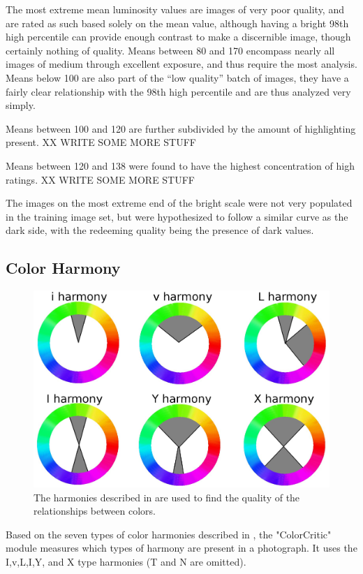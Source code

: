 \documentclass[twocolumn]{article}
\begin{document}
The most extreme mean luminosity values are images of very poor quality, and are rated as such based solely on the mean value, although having a bright 98th high percentile can provide enough contrast to make a discernible image, though certainly nothing of quality. Means between 80 and 170 encompass nearly all images of medium through excellent exposure, and thus require the most analysis. Means below 100 are also part of the “low quality” batch of images, they have a fairly clear relationship with the 98th high percentile and are thus analyzed very simply.

Means between 100 and 120 are further subdivided by the amount of highlighting present. XX WRITE SOME MORE STUFF

Means between 120 and 138 were found to have the highest concentration of high ratings. XX WRITE SOME MORE STUFF

The images on the most extreme end of the bright scale were not very populated in the training image set, but were hypothesized to follow a similar curve as the dark side, with the redeeming quality being the presence of dark values.

\subsection{Color Harmony}   
\begin{figure}[t]
  \centering
    \includegraphics[scale=0.38,clip]{colorharmony.eps}
  \caption{The harmonies described in \cite{COL:COL10004} are used to find the quality of the relationships between colors.}
\end{figure}

Based on the seven types of color harmonies described in \cite{Cohen-Or:2006:CH:1179352.1141933}, the "ColorCritic" module measures which types of harmony are present in a photograph. It uses the I,v,L,I,Y, and X type harmonies (T and N are omitted).
\end{document}

